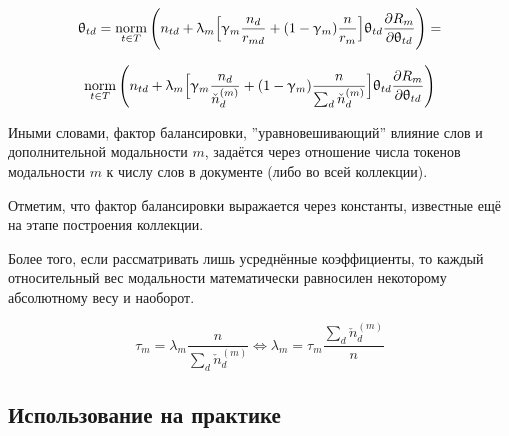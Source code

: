  

\[ 

\theta_{td} = \norm_{t \in T} \Bigg(  

    n_{td} + \lambda_m \Big[ 

        \gamma_m \frac{n_d}{r_{md}} + (1-\gamma_m)\frac{n}{r_m} 

        \Big]  

    \theta_{td} \frac{\partial R_m}{\partial \theta_{td}} 

\Bigg) =  

\] 

\[ 

\norm_{t \in T} \Bigg(  

    n_{td} + \lambda_m \Big[ 

        \gamma_m \frac{n_d}{\check{n}_d^{(m)}} + (1-\gamma_m)\frac{n}{\sum_d \check{n}_d^{(m)}} 

        \Big]  

    \theta_{td} \frac{\partial R_m}{\partial \theta_{td}} 

\Bigg) 

\] 

 

Иными словами, фактор балансировки, ''уравновешивающий'' влияние слов и дополнительной модальности $m$, задаётся через отношение числа токенов модальности $m$ к числу слов в документе (либо во всей коллекции). 

 

Отметим, что фактор балансировки выражается через константы, известные ещё на этапе построения коллекции. 

 

Более того, если рассматривать лишь усреднённые коэффициенты, то каждый относительный вес модальности математически равносилен некоторому абсолютному весу и наоборот. 

 

\[ 

\tau_m = \lambda_m \frac{n}{\sum_d \check{n}_d^{(m)}} \iff  

\lambda_m = \tau_m \frac{\sum_d \check{n}_d^{(m)}}{n} 

\] 

 

 

\subsection{Использование на практике} 

 

